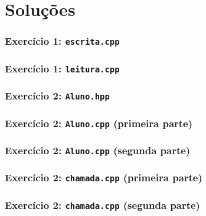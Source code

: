 \documentclass[aspectratio=169]{beamer}
\begin{document}
\section{Soluções}

\begin{frame}[fragile]\frametitle{Exercício 1: \texttt{escrita.cpp}}

\end{frame}

\begin{frame}[fragile]\frametitle{Exercício 1: \texttt{leitura.cpp}}
\fontsize{6pt}{6pt}\selectfont{

}
\end{frame}

\begin{frame}[fragile]\frametitle{Exercício 2: \texttt{Aluno.hpp}}

\end{frame}

\begin{frame}[fragile]\frametitle{Exercício 2: \texttt{Aluno.cpp} (primeira parte)}

\end{frame}

\begin{frame}[fragile]\frametitle{Exercício 2: \texttt{Aluno.cpp} (segunda parte)}

\end{frame}

\begin{frame}[fragile]\frametitle{Exercício 2: \texttt{chamada.cpp} (primeira parte)}
\fontsize{6pt}{6pt}\selectfont{

}
\end{frame}

\begin{frame}[fragile]\frametitle{Exercício 2: \texttt{chamada.cpp} (segunda parte)}
\fontsize{6pt}{6pt}\selectfont{

}
\end{frame}

\end{document}
